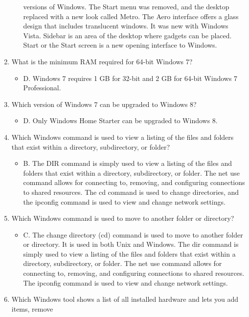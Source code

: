\documentclass{article}
\begin{document}
\begin{enumerate}
\begin{itemize}
versions of Windows. The Start menu was removed, and the desktop replaced with a
new look called Metro. The Aero interface offers a glass design that includes translucent
windows. It was new with Windows Vista. Sidebar is an area of the desktop where gadgets
can be placed. Start or the Start screen is a new opening interface to Windows.
    \end{itemize}
    \item What is the minimum RAM required for 64-bit Windows 7?
    \begin{itemize}
        \item D. Windows 7 requires 1 GB for 32-bit and 2 GB for 64-bit Windows 7 Professional.
    \end{itemize}
    \item Which version of Windows 7 can be upgraded to Windows 8?
    \begin{itemize}
        \item D. Only Windows Home Starter can be upgraded to Windows 8.
    \end{itemize}
    \item Which Windows command is used to view a listing of the files and folders that exist within
a directory, subdirectory, or folder?
    \begin{itemize}
        \item B. The DIR command is simply used to view a listing of the files and folders that exist
within a directory, subdirectory, or folder. The net use command allows for connecting
to, removing, and configuring connections to shared resources. The cd command is used
to change directories, and the ipconfig command is used to view and change network
settings.
    \end{itemize}
    \item Which Windows command is used to move to another folder or directory?
    \begin{itemize}
        \item C. The change directory (cd) command is used to move to another folder or directory.
It is used in both Unix and Windows. The dir command is simply used to view a listing
of the files and folders that exist within a directory, subdirectory, or folder. The net use
command allows for connecting to, removing, and configuring connections to shared
resources. The ipconfig command is used to view and change network settings.
    \end{itemize}
    \item Which Windows tool shows a list of all installed hardware and lets you add items, remove

\end{enumerate}
\end{document}
